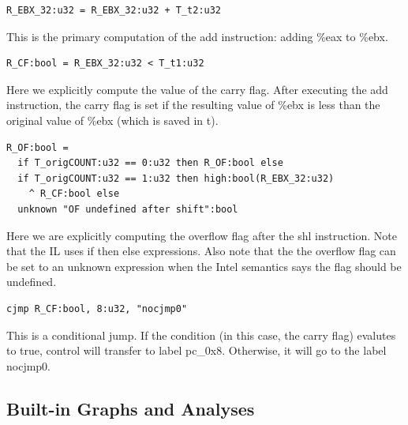 \begin{verbatim}
R_EBX_32:u32 = R_EBX_32:u32 + T_t2:u32
\end{verbatim}
This is the primary computation of the add instruction: adding \%eax
to \%ebx.

\begin{verbatim}
R_CF:bool = R_EBX_32:u32 < T_t1:u32
\end{verbatim}
Here we explicitly compute the value of the carry flag.  After
executing the add instruction, the carry flag is set if the resulting
value of \%ebx is less than the original value of \%ebx (which is
saved in t).

\begin{verbatim}
R_OF:bool =
  if T_origCOUNT:u32 == 0:u32 then R_OF:bool else
  if T_origCOUNT:u32 == 1:u32 then high:bool(R_EBX_32:u32)
    ^ R_CF:bool else
  unknown "OF undefined after shift":bool
\end{verbatim}
Here we are explicitly computing the overflow flag after the shl
instruction.  Note that the IL uses if then else expressions.  Also
note that the the overflow flag can be set to an unknown expression
when the Intel semantics says the flag should be undefined.

\begin{verbatim}
cjmp R_CF:bool, 8:u32, "nocjmp0"
\end{verbatim}
This is a conditional jump.  If the condition (in this case, the carry
flag) evalutes to true, control will transfer to label pc\_0x8.
Otherwise, it will go to the label nocjmp0.

\subsection{Built-in Graphs and Analyses}

